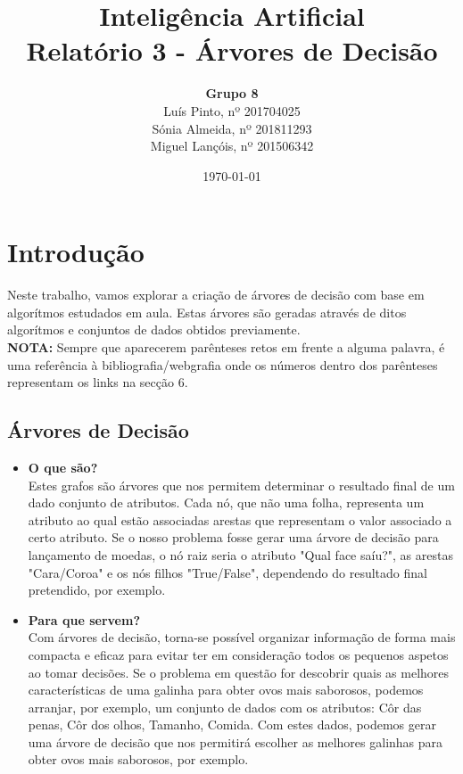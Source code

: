 \documentclass{article}
\title{\textbf{Inteligência Artificial\\Relatório 3 - Árvores de Decisão}}
\author{\textbf{Grupo 8}\\[4mm]Luís Pinto, nº 201704025\\Sónia Almeida, nº 201811293\\Miguel Lançóis, nº 201506342}
\date{\today}
\begin{document}
\maketitle
\newpage
\tableofcontents
\clearpage
\pagestyle{fancy}
\fancyhf{}
\setlength{\headheight}{30pt}
\setlength{\footskip}{15pt}
\rfoot{\thepage}
\section{Introdução}
\hspace{10mm}Neste trabalho, vamos explorar a criação de árvores de decisão com base em algorítmos estudados em aula. Estas árvores são geradas através de ditos algorítmos e conjuntos de dados obtidos previamente.\\[2mm]
\textbf{NOTA:} Sempre que aparecerem parênteses retos em frente a alguma palavra, é uma referência à bibliografia/webgrafia onde os números dentro dos parênteses representam os links na secção 6.
\subsection*{Árvores de Decisão}
\begin{itemize}
\item{\textbf{O que são?}\\
Estes grafos são árvores que nos permitem determinar o resultado final de um dado conjunto de atributos. Cada nó, que não uma folha, representa um atributo ao qual estão associadas arestas que representam o valor associado a certo atributo. Se o nosso problema fosse gerar uma árvore de decisão para lançamento de moedas, o nó raiz seria o atributo "Qual face saíu?", as arestas "Cara/Coroa" e os nós filhos "True/False", dependendo do resultado final pretendido, por exemplo.}
\item{\textbf{Para que servem?}\\
Com árvores de decisão, torna-se possível organizar informação de forma mais compacta e eficaz para evitar ter em consideração todos os pequenos aspetos ao tomar decisões. Se o problema em questão for descobrir quais as melhores características de uma galinha para obter ovos mais saborosos, podemos arranjar, por exemplo, um conjunto de dados com os atributos: Côr das penas, Côr dos olhos, Tamanho, Comida. Com estes dados, podemos gerar uma árvore de decisão que nos permitirá escolher as melhores galinhas para obter ovos mais saborosos, por exemplo.}
\end{itemize}
\end{document}
